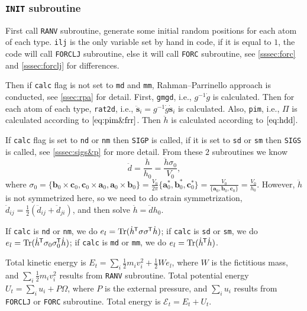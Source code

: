 
\subsubsection{\texttt{INIT} subroutine}
\label{sssec:init}

First call \texttt{RANV} subroutine,
generate some initial random positions for each atom of each type.
\texttt{ilj} is the only variable set by hand in code, if it is equal to $1$,
the code will call \texttt{FORCLJ} subroutine, else it will call \texttt{FORC}
subroutine, see \ref{sssec:forc} and \ref{sssec:forclj} for differences.

Then if \texttt{calc} flag is not set to \texttt{md} and \texttt{mm},
Rahman--Parrinello approach is conducted, see \ref{ssec:rpa} for detail.
First, \texttt{gmgd}, i.e., $g^{-1} \dot{g}$ is calculated.
Then for each atom of each type,
\texttt{rat2d}, i.e., $\ddot{\bm{s}}_i = g^{-1} \dot{g} \dot{ \bm{s} }_i$ is calculated.
Also, \texttt{pim}, i.e., $\Pi$ is calculated according to $\eqref{eq:pim&frr}$.
Then $\ddot{h}$ is calculated according to $\eqref{eq:hdd}$.

If \texttt{calc} flag is set to \texttt{nd} or \texttt{nm}
then \texttt{SIGP} is called, if it is set to \texttt{sd} or
\texttt{sm} then \texttt{SIGS} is called, see \ref{sssec:sigs&p}
for more detail.
From these $2$ subroutines we know
\begin{equation}
 \ddot{d} = \frac{ \ddot{h} }{ h_0 } = \frac{ \ddot{h} \sigma_0}{V_0},
\end{equation}
where
$\sigma_0 =
\{
\bm{b}_0 \times \bm{c}_0, \bm{c}_0 \times \bm{a}_0,
\bm{a}_0 \times \bm{b}_0
\}
= \frac{ V_0 }{ 2\pi } \{
\bm{a}^\ast_0, \bm{b}^\ast_0, \bm{c}^\ast_0
\} = \frac{ V_0 }{ \{\bm{a}_0, \bm{b}_0, \bm{c}_0 \} } = \frac{ V_0 }{ h_0 }$.
However, $\ddot{h}$ is not symmetrized here, so we need to do
strain symmetrization, $\ddot{d}_{ij} = \frac{ 1 }{ 2 }
(\ddot{d}_{ij} + \ddot{d}_{ji})$, and then solve
$\ddot{h} = \ddot{d} h_0$.

If \texttt{calc} is \texttt{nd} or \texttt{nm}, we do
$e_l = \operatorname{Tr} (\dot{h}^{\mkern-1.5mu\mathsf{T}} \sigma \sigma^{\mkern-1.5mu\mathsf{T}} \dot{h})$; if \texttt{calc} is  \texttt{sd} or \texttt{sm}, we do
$e_l = \operatorname{Tr}(\dot{h}^{\mkern-1.5mu\mathsf{T}} \sigma_0 \sigma_0^{\mkern-1.5mu\mathsf{T}} \dot{ h })$; 
if \texttt{calc} is \texttt{md} or \texttt{mm}, we do $e_l = \operatorname{Tr}(\dot{h}^{\mkern-1.5mu\mathsf{T}} \dot{ h })$.

Total kinetic energy is $E_t = \sum_{i} \frac{ 1 }{ 2 } m_i v_i^2 + \frac{ 1 }{ 2 } W e_l$,
where $W$ is the fictitious mass, and $\sum_{i} \frac{ 1 }{ 2 } m_i v_i^2$
results from \texttt{RANV} subroutine.
Total potential energy $U_{t} = \sum_{i} u_i + P \Omega$, where $P$ is the external pressure,
and $\sum_{i} u_i$ results from \texttt{FORCLJ} or \texttt{FORC} subroutine.
Total energy is $\mathscr{E}_{t} = E_t + U_{t}$.


